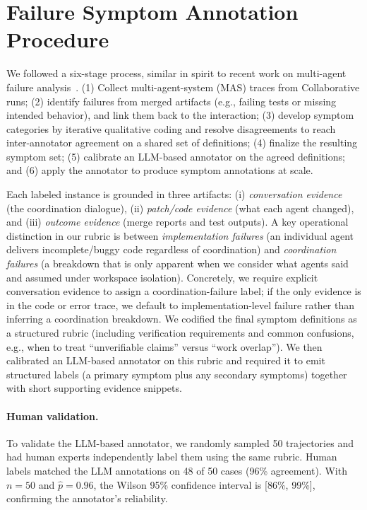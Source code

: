 \section{Failure Symptom Annotation Procedure}\label{app:symptom_annotation}

We followed a six-stage process, similar in spirit to recent work on multi-agent failure analysis~\citep{cemri2025multiagentllmsystemsfail}.
(1) Collect multi-agent-system (MAS) traces from Collaborative runs; (2) identify failures from merged artifacts (e.g., failing tests or missing intended behavior), and link them back to the interaction; (3) develop symptom categories by iterative qualitative coding and resolve disagreements to reach inter-annotator agreement on a shared set of definitions; (4) finalize the resulting symptom set; (5) calibrate an LLM-based annotator on the agreed definitions; and (6) apply the annotator to produce symptom annotations at scale.

Each labeled instance is grounded in three artifacts: (i) \emph{conversation evidence} (the coordination dialogue), (ii) \emph{patch/code evidence} (what each agent changed), and (iii) \emph{outcome evidence} (merge reports and test outputs).
A key operational distinction in our rubric is between \emph{implementation failures} (an individual agent delivers incomplete/buggy code regardless of coordination) and \emph{coordination failures} (a breakdown that is only apparent when we consider what agents said and assumed under workspace isolation).
Concretely, we require explicit conversation evidence to assign a coordination-failure label; if the only evidence is in the code or error trace, we default to implementation-level failure rather than inferring a coordination breakdown.
We codified the final symptom definitions as a structured rubric (including verification requirements and common confusions, e.g., when to treat ``unverifiable claims'' versus ``work overlap'').
We then calibrated an LLM-based annotator on this rubric and required it to emit structured labels (a primary symptom plus any secondary symptoms) together with short supporting evidence snippets.


\paragraph{Human validation.}
To validate the LLM-based annotator, we randomly sampled 50 trajectories and had human experts independently label them using the same rubric. Human labels matched the LLM annotations on 48 of 50 cases (96\% agreement). With $n=50$ and $\hat{p}=0.96$, the Wilson 95\% confidence interval is [86\%, 99\%], confirming the annotator's reliability.


